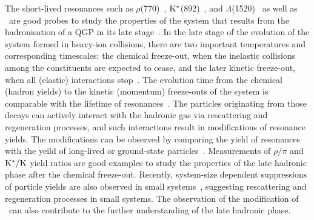 The short-lived resonances such as $\rho$(770)~\cite{ALICE:2018qdv}, $\rm{}K^{*}$(892)~\cite{ALICE:2019etb, ALICE:2016sak}, and $\Lambda$(1520)~\cite{ALICE:2018ewo} as well as \fzero\ are good probes to study the properties of the system that results from the hadronisation of a QGP in its late stage~\cite{Bierlich:2021poz}. In the late stage of the evolution of the system formed in heavy-ion collisions, there are two important temperatures and corresponding timescales: the chemical freeze-out, when the inelastic collisions among the constituents are expected to cease, and the later kinetic freeze-out, when all (elastic) interactions stop~\cite{Song:1996ik}. The evolution time from the chemical (hadron yields) to the kinetic (momentum) freeze-outs of the system is comparable with the lifetime of resonances~\cite{ALICE:2011dyt, ALICE:2019xyr}. The particles originating from those decays can actively interact with the hadronic gas via rescattering and regeneration processes, and such interactions result in modifications of resonance yields. The modifications can be observed by comparing the yield of resonances with the yeild of long-lived or ground-state particles~\cite{ALICE:2018pal}. Measurements of $\rho/\pi$ and $\rm{}K^{*}/K$ yield ratios are good examples to study the properties of the late hadronic phase after the chemical freeze-out. Recently, system-size dependent suppressions of particle yields are also observed in small systems~\cite{ALICE:2019etb}, suggesting rescattering and regeneration processes in small systems. The observation of the modification of \fzero~can also contribute to the further understanding of the late hadronic phase.




 





